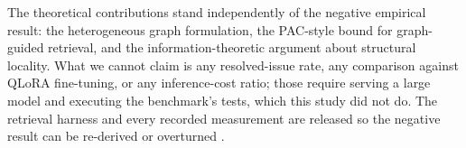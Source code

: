 \documentclass[10pt,journal,compsoc,twocolumn]{IEEEtran}
\begin{document}
The theoretical contributions stand independently of the negative empirical result: the heterogeneous graph formulation, the PAC-style bound for graph-guided retrieval, and the information-theoretic argument about structural locality. What we cannot claim is any resolved-issue rate, any comparison against QLoRA fine-tuning, or any inference-cost ratio; those require serving a large model and executing the benchmark's tests, which this study did not do. The retrieval harness and every recorded measurement are released so the negative result can be re-derived or overturned \cite{arxiv_2406_00584,crossref_10_1201_9788743808145_14}.


\par\vspace{0.5em}
\balance


\end{document}

